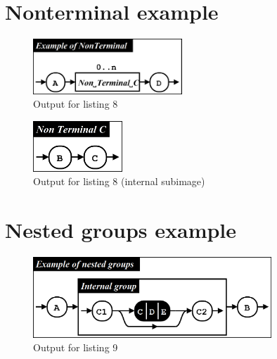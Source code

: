 \documentclass[12pt,a4paper]{article}
\begin{document}
\section{Nonterminal example}



\begin{figure}[h!]
\caption{Output for listing 8}
\centering
\includegraphics[width=0.5\textwidth]{results/ex03a.png}
\end{figure}

\begin{figure}[h!]
\caption{Output for listing 8 (internal subimage)}
\centering
\includegraphics[width=0.3\textwidth]{results/ex03b.png}
\end{figure}

\section{Nested groups example}



\begin{figure}[h!]
\caption{Output for listing 9}
\centering
\includegraphics[width=0.8\textwidth]{results/ex09.png}
\end{figure}

\end{document}
